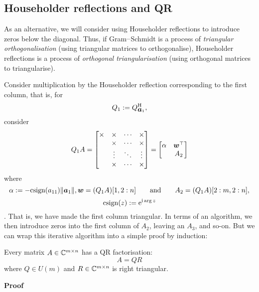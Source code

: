 \subsection{Householder reflections and QR}
As an alternative, we will consider using Householder reflections to introduce zeros below the diagonal. Thus, if Gram\ensuremath{\endash}Schmidt is a process of \emph{triangular orthogonalisation} (using triangular matrices to orthogonalise), Householder reflections is a process of \emph{orthogonal triangularisation}  (using orthogonal matrices to triangularise).

Consider multiplication by the Householder reflection corresponding to the first column, that is, for
\[
Q_1 := Q_{\bm{{\mbox{\boldmath$a$\unboldmath}}}_1}^{\rm H},
\]
consider
\[
Q_1 A = \begin{bmatrix} \ensuremath{\times} & \ensuremath{\times} & \ensuremath{\cdots} & \ensuremath{\times} \\
& \ensuremath{\times} & \ensuremath{\cdots} & \ensuremath{\times} \\
                    & \ensuremath{\vdots} & \ensuremath{\ddots} & \ensuremath{\vdots} \\
                    & \ensuremath{\times} & \ensuremath{\cdots} & \ensuremath{\times} \end{bmatrix} = 
\begin{bmatrix}  \ensuremath{\alpha} & \ensuremath{\bm{\w}}^\ensuremath{\top} \\ 
& A_2   \end{bmatrix}
\]
where 
\[
\alpha := -{\rm csign}(a_{11})  \|\bm{{\mbox{\boldmath$a$\unboldmath}}}_1\|, \bm{{\mbox{\boldmath$w$\unboldmath}}} = (Q_1 A)[1, 2:n]  \qquad \hbox{and} \qquad A_2 = (Q_1 A)[2:m, 2:n],
\]
\[
{\rm csign}(z) :=  {\rm e}^{{\rm i} \arg z}
\]
.  That is, we have made the first column triangular. In terms of an algorithm, we then introduce zeros into the first column of $A_2$, leaving an $A_3$, and so-on. But we can wrap this iterative algorithm into a simple proof by induction:

\begin{theorem}[QR]  Every matrix $A \in {\mathbb C}^{m \times n}$ has a QR factorisation:
\[
A = QR
\]
where $Q \ensuremath{\in} U(m)$ and $R \in {\mathbb C}^{m \times n}$ is right triangular.

\end{theorem}
\textbf{Proof}

